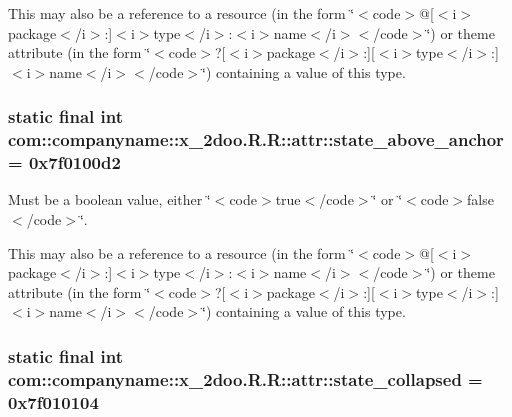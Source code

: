 This may also be a reference to a resource (in the form \char`\"{}$<$code$>$@\mbox{[}$<$i$>$package$<$/i$>$:\mbox{]}$<$i$>$type$<$/i$>$:$<$i$>$name$<$/i$>$$<$/code$>$\char`\"{}) or theme attribute (in the form \char`\"{}$<$code$>$?\mbox{[}$<$i$>$package$<$/i$>$:\mbox{]}\mbox{[}$<$i$>$type$<$/i$>$:\mbox{]}$<$i$>$name$<$/i$>$$<$/code$>$\char`\"{}) containing a value of this type. \hypertarget{classcom_1_1companyname_1_1x__2doo_1_1_r_1_1attr_217abc47da25760c491c7a95e32a9cf7}{
\subsubsection[{state\_\-above\_\-anchor}]{\setlength{\rightskip}{0pt plus 5cm}static final int com::companyname::x\_\-2doo.R.R::attr::state\_\-above\_\-anchor = 0x7f0100d2}}
\label{classcom_1_1companyname_1_1x__2doo_1_1_r_1_1attr_217abc47da25760c491c7a95e32a9cf7}


Must be a boolean value, either \char`\"{}$<$code$>$true$<$/code$>$\char`\"{} or \char`\"{}$<$code$>$false$<$/code$>$\char`\"{}. 

This may also be a reference to a resource (in the form \char`\"{}$<$code$>$@\mbox{[}$<$i$>$package$<$/i$>$:\mbox{]}$<$i$>$type$<$/i$>$:$<$i$>$name$<$/i$>$$<$/code$>$\char`\"{}) or theme attribute (in the form \char`\"{}$<$code$>$?\mbox{[}$<$i$>$package$<$/i$>$:\mbox{]}\mbox{[}$<$i$>$type$<$/i$>$:\mbox{]}$<$i$>$name$<$/i$>$$<$/code$>$\char`\"{}) containing a value of this type. \hypertarget{classcom_1_1companyname_1_1x__2doo_1_1_r_1_1attr_524f5fa78382c2b0f61943e946654db2}{
\subsubsection[{state\_\-collapsed}]{\setlength{\rightskip}{0pt plus 5cm}static final int com::companyname::x\_\-2doo.R.R::attr::state\_\-collapsed = 0x7f010104}}
\label{classcom_1_1companyname_1_1x__2doo_1_1_r_1_1attr_524f5fa78382c2b0f61943e946654db2}



